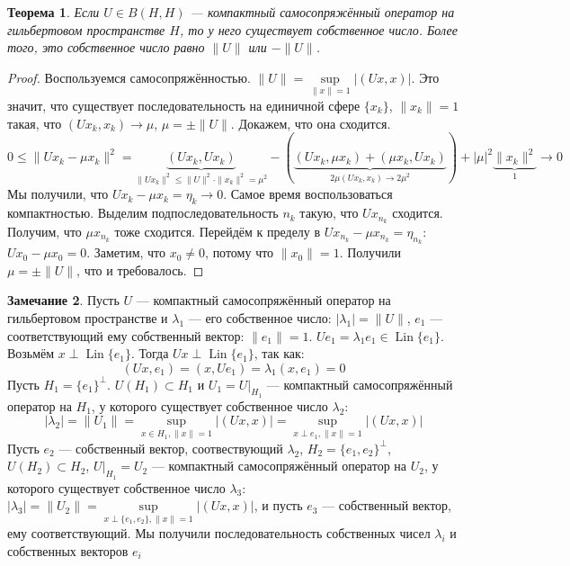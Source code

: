 \documentclass[11pt,openany,a4paper]{scrartcl}
\theoremstyle{plain}
\newtheorem{theorem}{Теорема}[subsection]
\theoremstyle{definition}
\newtheorem{remark}[theorem]{Замечание}
\DeclareMathOperator{\Lin}{Lin}
\begin{document}
\begin{theorem}
    Если $U \in B(H, H)$ — компактный самосопряжённый оператор на гильбертовом пространстве $H$, то
    у него существует собственное число. Более того, это собственное число равно $\|U\|$ или
    $-\|U\|$.
\end{theorem}
\begin{proof}
    Воспользуемся самосопряжённостью. $\|U\| = \sup\limits_{\|x\|=1}|(Ux, x)|$. Это значит,
    что существует последовательность на единичной сфере $\{x_k\}$, $\|x_k\|=1$ такая, что
    $(Ux_k, x_k) \to \mu$, $\mu = \pm \|U\|$. Докажем, что она сходится.
    $$
    0 \leqslant \|Ux_k - \mu x_k\|^2 =
    \underbrace{(Ux_k, Ux_k)}_{\|Ux_k\|^2 \leqslant \|U\|^2 \cdot \|x_k\|^2 = \mu^2} -
    (\underbrace{(Ux_k, \mu x_k) + (\mu x_k, Ux_k)}_{2\mu(Ux_k, x_k) \to 2 \mu^2})
    + |\mu|^2\underbrace{\|x_k\|^2}_{1} \to 0
    $$
    Мы получили, что $Ux_k - \mu x_k = \eta_k \to 0$. Самое время воспользоваться компактностью.
    Выделим подпоследовательность $n_k$ такую, что $Ux_{n_k}$ сходится. Получим, что
    $\mu x_{n_k}$ тоже сходится. Перейдём к пределу в $Ux_{n_k} - \mu x_{n_k} = \eta_{n_k}$:
    $Ux_0 - \mu x_0 = 0$. Заметим, что $x_0 \neq 0$, потому что $\|x_0\| = 1$. Получили
    $\mu = \pm \|U\|$, что и требовалось.
\end{proof}

\begin{remark}\label{eigennumber_sequence}
    Пусть $U$ — компактный самосопряжённый оператор на гильбертовом пространстве и $\lambda_1$ — 
    его собственное число: $|\lambda_1| = \|U\|$, $e_1$ — соответствующий ему собственный вектор:
    $\|e_1\| = 1$. $Ue_1 = \lambda_1 e_1 \in \Lin\{e_1\}$. Возьмём $x \perp \Lin\{e_1\}$. Тогда
    $Ux \perp \Lin\{e_1\}$, так как:
    $$
    (Ux, e_1) = (x, Ue_1) = \lambda_1(x, e_1) = 0
    $$
    Пусть $H_1 = \{e_1\}^\perp$. $U(H_1) \subset H_1$ и $U_1 = U|_{H_1}$ — компактный 
    самосопряжённый оператор на $H_1$, у которого существует собственное число
    $\lambda_2$:
    $$
    |\lambda_2| = \|U_1\| = \sup\limits_{x \in H_1, \|x\|=1} |(Ux, x)| =
    \sup\limits_{x \perp e_1, \|x\|=1} |(Ux, x)|
    $$
    Пусть $e_2$ — собственный вектор, соотвествующий $\lambda_2$, $H_2 = \{e_1, e_2\}^\perp$,
    $U(H_2) \subset H_2$, $U|_{H_1} = U_2$ — компактный самосопряжённый оператор на $U_2$, у 
    которого существует собственное число $\lambda_3$: $|\lambda_3| = \|U_2\| =
    \sup\limits_{x\perp\{e_1,e_2\}, \|x\|=1} |(Ux, x)|$, и пусть $e_3$ — собственный вектор, ему
    соответствующий. Мы получили последовательность собственных чисел $\lambda_i$ и собственных
    векторов $e_i$
\end{remark}
\end{document}

